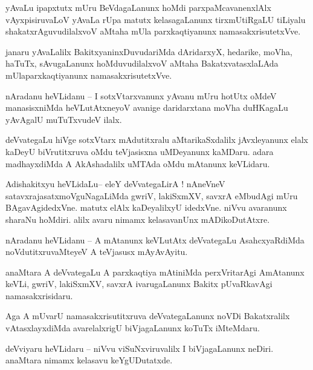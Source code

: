 \documentclass{article}
\begin{document}
\begin{mn}%
yAvaLu ipapxtutx mUru BeVdagaLanunx hoMdi parxpaMcavanenxlAlx vAyxpisiruvaLoV yAvaLa rUpa matutx 
kelasagaLanunx tirxmUtiRgaLU tiLiyalu shakatxrAguvudilalxvoV aMtaha mUla parxkaqtiyanunx 
namasakxrisutetxVve.
\end{mn}

\begin{mn}%
janaru yAvaLalilx BakitxyaninxDuvudariMda dAridarxyX, hedarike, moVha, haTuTx, sAvugaLanunx 
hoMduvudilalxvoV aMtaha BakatxvatasxlaLAda mUlaparxkaqtiyanunx namasakxrisutetxVve.
\end{mn}

\begin{mn}%
nAradanu heVLidanu -- I sotxVtarxvanunx yAvanu mUru hotUtx oMdeV manasisxniMda heVLutAtxneyoV 
avanige daridarxtana moVha duHKagaLu yAvAgalU muTuTxvudeV ilalx.
\end{mn}

\begin{mn}%
deVvategaLu hiVge sotxVtarx mAdutitxralu aMtarikaSxdalilx jAvxleyanunx elalx kaDeyU biVrutitxruva 
oMdu teVjasisxna uMDeyanunx kaMDaru. adara madhayxdiMda A AkAshadalilx uMTAda oMdu mAtanunx 
keVLidaru.
\end{mn}

\begin{mn}%
Adishakitxyu heVLidaLu-- eleY deVvategaLirA ! nAneVneV satavxrajasatxmoVguNagaLiMda gwriV, 
lakiSxmXV, savxrA eMbudAgi mUru BAgavAgidedxVne. matutx elAlx kaDeyalilxyU idedxVne. niVvu 
avaranunx sharaNu hoMdiri. alilx avaru nimamx kelasavanUnx mADikoDutAtxre.
\end{mn}

\begin{mn}%
nAradanu heVLidanu -- A mAtanunx keVLutAtx deVvategaLu AsahcxyaRdiMda noVdutitxruvaMteyeV A 
teVjasusx mAyAvAyitu.
\end{mn}

\begin{mn}%
anaMtara A deVvategaLu A parxkaqtiya mAtiniMda perxVritarAgi AmAtanunx keVLi, gwriV, lakiSxmXV, 
savxrA ivarugaLanunx Bakitx pUvaRkavAgi namasakxrisidaru.
\end{mn}

\begin{mn}%
Aga A mUvarU namasakxrisutitxruva deVvategaLanunx noVDi Bakatxralilx vAtasxlayxdiMda avarelalxrigU 
biVjagaLanunx koTuTx iMteMdaru.
\end{mn}

\begin{mn}%
deVviyaru heVLidaru -- niVvu viSuNxviruvalilx I biVjagaLanunx neDiri. anaMtara nimamx kelasavu 
keYgUDutatxde.
\end{mn}
\end{document}
